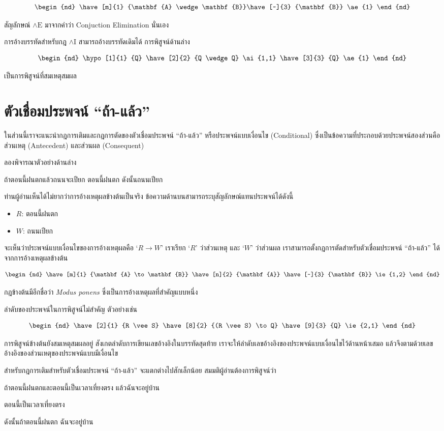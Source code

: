 \documentclass[a4paper,12pt]{extbook}
\theoremstyle{definition}
\theoremstyle{remark}
\newcommand{\q}[1]{``#1''}
\newcommand{\fitch}[1]{
	
\begin{minipage}[l]{0.5in}%
		\begin{equation*}%
		\begin{nd}%
		#1	%
		\end{nd}%
		\end{equation*}%
		\vspace{0pt}%
\end{minipage}%

}
\newcommand{\boxthis}[1]{
	\begin{textbox}%
		#1 
	\end{textbox}%
}
\begin{document}
		\boxthis{
			\fitch{		
				\have[m]{1}		{\mathbf{A} \wedge \mathbf{B}}%
				\have[~]{3}		{\mathbf{B}}					\ae{1}
			}
		}
		สัญลักษณ์ $\wedge\text{E}$ มาจากคำว่า Conjuction Elimination นั่นเอง
		
		การอ้างบรรทัดสำหรับกฎ $\wedge$I สามารถอ้างบรรทัดเดิมได้ การพิสูจน์ด้านล่าง
		\fitch{
			\hypo[1]{1}		{Q}
			\have[2]{2}		{Q \wedge Q}	\ai{1,1}
			\have[3]{3}		{Q}				\ae{1}
		}
		เป็นการพิสูจน์ที่สมเหตุสมผล
		
		\section{ตัวเชื่อมประพจน์ \q{ถ้า-แล้ว}}
		ในส่วนนี้เราจะแนะนำกฎการเติมและกฎการตัดของตัวเชื่อมประพจน์ \q{ถ้า-แล้ว} หรือประพจน์แบบเงื่อนไข (Conditional) ซึ่งเป็นข้อความที่ประกอบด้วยประพจน์สองส่วนคือส่วนเหตุ (Antecedent) และส่วนผล (Consequent) 
		
		ลองพิจารณาตัวอย่างด้านล่าง
		
		\begin{center}
			ถ้าตอนนี้ฝนตกแล้วถนนจะเปียก ตอนนี้ฝนตก ดังนั้นถนนเปียก
		\end{center}
	
		ท่านผู้อ่านเห็นได้ไม่ยากว่าการอ้างเหตุผลข้างต้นเป็นจริง ข้อความด้านบนสามารถระบุสัญลักษณ์แทนประพจน์ได้ดังนี้
		\begin{itemize}
			\item[]	$R$: ตอนนี้ฝนตก
			\item[]	$W$: ถนนเปียก
		\end{itemize}
		จะเห็นว่าประพจน์แบบเงื่อนไขของการอ้างเหตุผลคือ `$R \to W$' เราเรียก `$R$' ว่าส่วนเหตุ และ `$W$' ว่าส่วนผล เราสามารถตั้งกฎการตัดสำหรับตัวเชื่อมประพจน์ \q{ถ้า-แล้ว} ได้จากการอ้างเหตุผลข้างต้น
		\boxthis{
			\fitch{
			\have[m]{1}	{\mathbf{A} \to \mathbf{B}}
			\have[n]{2}	{\mathbf{A}}
			\have[~]{3}	{\mathbf{B}}	\ie{1,2}
			}	
		}
		กฎข้างต้นมีอีกชื่อว่า \textit{Modus ponens} ซึ่งเป็นการอ้างเหตุผลที่สำคัญแบบหนึ่ง  
		
		ลำดับของประพจน์ในการพิสูจน์ไม่สำคัญ ตัวอย่างเช่น
		\fitch{
			\have[2]{1}	{R \vee S}
			\have[8]{2}	{(R \vee S) \to Q}
			\have[9]{3}	{Q}	\ie{2,1}
		}
		การพิสูจน์ข้างต้นยังสมเหตุสมผลอยู่ สังเกตลำดับการเขียนเลขอ้างอิงในบรรทัดสุดท้าย เราจะให้ลำดับเลขอ้างอิงของประพจน์แบบเงื่อนไขไว้ด้านหน้าเสมอ แล้วจึงตามด้วยเลขอ้างอิงของส่วนเหตุของประพจน์แบบมีเงื่อนไข
		
		สำหรับกฎการเติมสำหรับตัวเชื่อมประพจน์ \q{ถ้า-แล้ว} จะแตกต่างไปสักเล็กน้อย สมมติผู้อ่านต้องการพิสูจน์ว่า
		\begin{center}
			\begin{minipage}{0.6\textwidth}
				ถ้าตอนนี้ฝนตกและตอนนี้เป็นเวลาเที่ยงตรง แล้วฉันจะอยู่บ้าน 
				
				ตอนนี้เป็นเวลาเที่ยงตรง	
				
				ดังนั้นถ้าตอนนี้ฝนตก ฉันจะอยู่บ้าน
			\end{minipage}
		\end{center}
	
\end{document}
